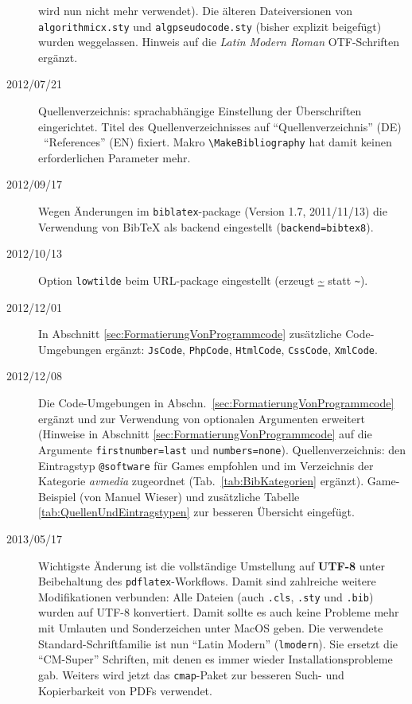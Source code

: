 \begin{sloppypar}
\begin{description}
wird nun nicht mehr verwendet).
\newline
Die älteren Dateiversionen von \texttt{algorithmicx.sty} und \texttt{alg\-pseudo\-code.sty}
(bisher explizit beigefügt) wurden weggelassen.
\newline
Hinweis auf die \emph{Latin Modern Roman} OTF-Schriften ergänzt.
%
\item[2012/07/21]
Quellenverzeichnis: sprachabhängige Einstellung der Überschriften eingerichtet.
Titel des Quellenverzeichnisses auf "`Quellenverzeichnis"' (DE) \bzw\ "`References"' (EN) 
fixiert. Makro \verb!\MakeBibliography! hat damit keinen erforderlichen Parameter mehr.
%
\item[2012/09/17]
Wegen Änderungen im \texttt{biblatex}-package (Version 1.7, 2011/11/13) die Verwendung von
BibTeX als backend eingestellt (\texttt{backend=bibtex8}).
%
\item[2012/10/13]
Option \texttt{lowtilde} beim URL-package eingestellt (erzeugt \url{~} statt \verb!~!).
%
\item[2012/12/01]
In Abschnitt \ref{sec:FormatierungVonProgrammcode} zusätzliche Code-Umgebungen ergänzt:
\texttt{JsCode},
\texttt{PhpCode},
\texttt{HtmlCode},
\texttt{CssCode},
\texttt{XmlCode}.
%
\item[2012/12/08]
Die Code-Umgebungen in Abschn.\ \ref{sec:FormatierungVonProgrammcode} ergänzt und 
zur Verwendung von optionalen Argumenten erweitert (Hinweise in Abschnitt 
\ref{sec:FormatierungVonProgrammcode} auf die Argumente
\texttt{firstnumber=last} und \texttt{numbers=none}).
Quellenverzeichnis: den Eintragstyp \texttt{@software} für Games empfohlen und im Verzeichnis
der Kategorie \emph{avmedia} zugeordnet (Tab.~\ref{tab:BibKategorien} ergänzt). 
Game-Beispiel (von Manuel Wieser) und zusätzliche Tabelle \ref{tab:QuellenUndEintragstypen}
zur besseren Übersicht eingefügt.
%
\item[2013/05/17]
Wichtigste Änderung ist die vollständige Umstellung auf \textbf{UTF-8} unter Beibehaltung des 
\texttt{pdflatex}-Workflows. 
Damit sind zahlreiche weitere Modifikationen verbunden:
\newline
Alle Dateien (auch \texttt{.cls}, \texttt{.sty} und \texttt{.bib}) wurden auf UTF-8 konvertiert.
Damit sollte es auch keine Probleme mehr mit Umlauten und Sonderzeichen unter MacOS geben.
\newline
Die verwendete Standard-Schriftfamilie ist nun "`Latin Modern"' (\texttt{lmodern}). 
Sie ersetzt die "`CM-Super"' Schriften, mit denen es immer wieder Installationsprobleme gab.
Weiters wird jetzt das \texttt{cmap}-Paket zur besseren Such- und Kopierbarkeit von PDFs verwendet.

\end{description}
\end{sloppypar}
